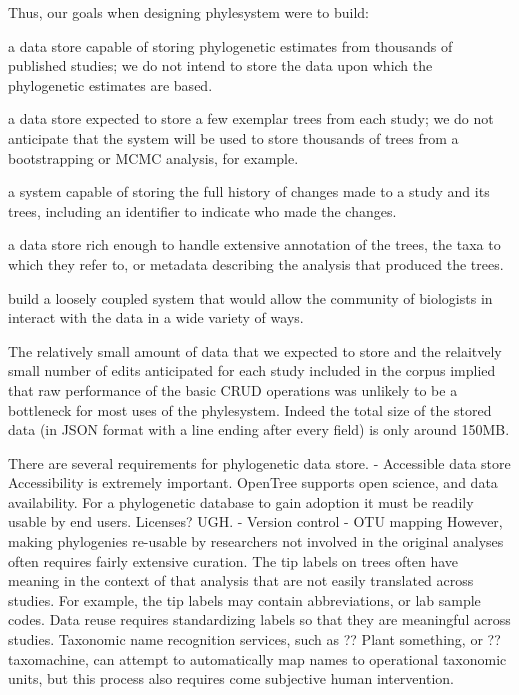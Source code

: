 \documentclass[a4paper,10pt]{article}
\newcommand{\ps}{phylesystem\xspace}
\begin{document}
Thus, our goals when designing \ps were to build:
\begin{compactenum}
    \item a data store capable of storing phylogenetic estimates from thousands of published studies; we do not intend to store the data upon which the phylogenetic estimates are based.
    \item a data store expected to store a few exemplar trees from each study; we do not anticipate that the system will be used to store thousands of trees from a bootstrapping or MCMC analysis, for example.
    \item a system capable of storing the full history of changes made to a study and its trees, including an identifier to indicate who made the changes.
    \item a data store rich enough to handle extensive annotation of the trees, the taxa to which they refer to, or metadata describing the analysis that produced the trees.
    \item build a loosely coupled system that would allow the community of biologists in interact with the data in a wide variety of ways.
\end{compactenum}

The relatively small amount of data that we expected to store and the relaitvely small
    number of edits anticipated for each study included in the corpus implied that 
    raw performance of the basic CRUD operations was unlikely to be a bottleneck for most
    uses of the \ps.
Indeed the total size of the stored data (in JSON format with a line ending after 
    every field) is only around 150MB.

There are several requirements for phylogenetic data store.
      - Accessible data store
Accessibility is extremely important.
OpenTree supports open science, and data availability.
For a phylogenetic database to gain adoption it must be readily usable by end users.
Licenses? UGH.
          - Version control
          - OTU mapping
However, making phylogenies re-usable by researchers not involved in the original analyses often requires fairly extensive curation.
The tip labels on trees often have meaning in the context of that analysis that are not easily translated across studies. 
For example, the tip labels may contain abbreviations, or lab sample codes.
Data reuse requires standardizing labels so that they are meaningful across studies.
Taxonomic name recognition services, such as ?? Plant something, or ?? taxomachine, can attempt to automatically map names to
operational taxonomic units, but this process also requires come subjective human intervention. 
\end{document}
